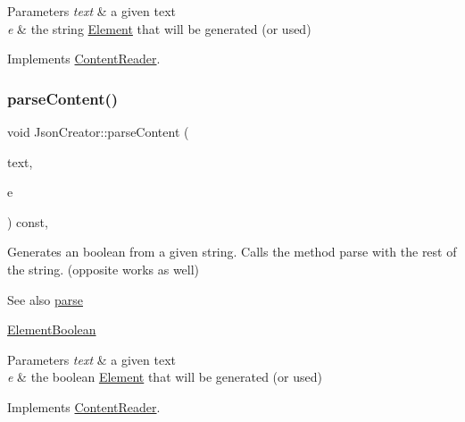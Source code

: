 \begin{DoxyParams}{Parameters}
{\em text} & a given text \\
\hline
{\em e} & the string \mbox{\hyperlink{classElement}{Element}} that will be generated (or used) \\
\hline
\end{DoxyParams}


Implements \mbox{\hyperlink{classContentReader_a310678ddc37a05aca2f13db73b22abe5}{Content\+Reader}}.

\mbox{\label{classJsonCreator_a95fb65046a7467b8e48feaf92a62b40c}} 
\subsubsection{\texorpdfstring{parse\+Content()}{parseContent()}\hspace{0.1cm}{\footnotesize\ttfamily [3/6]}}
{\footnotesize\ttfamily void Json\+Creator\+::parse\+Content (\begin{DoxyParamCaption}\item[{std\+::string \&}]{text,  }\item[{\mbox{\hyperlink{classElementBoolean}{Element\+Boolean}} $\ast$}]{e }\end{DoxyParamCaption}) const\hspace{0.3cm}{\ttfamily [override]}, {\ttfamily [virtual]}}

Generates an boolean from a given string. Calls the method parse with the rest of the string. (opposite works as well) \begin{DoxySeeAlso}{See also}
\mbox{\hyperlink{classJsonCreator_a505ff309c6b144d29478804b0e187c6f}{parse}} 

\mbox{\hyperlink{classElementBoolean}{Element\+Boolean}}
\end{DoxySeeAlso}

\begin{DoxyParams}{Parameters}
{\em text} & a given text \\
\hline
{\em e} & the boolean \mbox{\hyperlink{classElement}{Element}} that will be generated (or used) \\
\hline
\end{DoxyParams}


Implements \mbox{\hyperlink{classContentReader_a3ee0aec579c723f17742e10fe7c75e39}{Content\+Reader}}.

